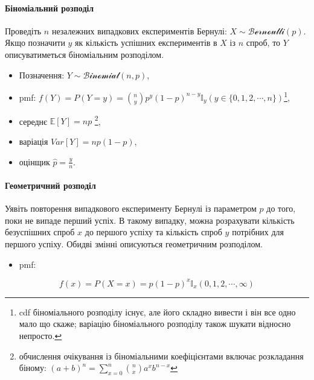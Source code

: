 \documentclass[
  11pt,
]{book}
\providecommand{\tightlist}{%
  \setlength{\itemsep}{0pt}\setlength{\parskip}{0pt}}
\begin{document}
\paragraph{Біноміальний
розподіл}\label{ux431ux456ux43dux43eux43cux456ux430ux43bux44cux43dux438ux439-ux440ux43eux437ux43fux43eux434ux456ux43b}

Проведіть \(n\) незалежних випадкових експериментів Бернулі:
\(X \sim \mathcal{Bernoulli}(p)\). Якщо позначити \(y\) як кількість
успішних експериментів в \(X\) із \(n\) спроб, то \(Y\) описуватиметься
біноміальним розподілом.

\begin{itemize}
\item
  Позначення: \(Y \sim \mathcal{Binomial}(n, p)\),
\item
  pmf:
  \(f(Y) = P(Y = y) = \binom{n}{y} p^y (1-p)^{n - y} \mathbb{I}_y (y \in \{0, 1, 2, \cdots, n\})\)\footnote{cdf
    біноміального розподілу існує, але його складно вивести і він все
    одно мало що скаже; варіацію біноміального розподілу також шукати
    відносно непросто.},
\item
  середнє \(\mathbb{E} [Y] = np\) \footnote{обчислення очікування із
    біноміальними коефіцієнтами включає розкладання біному:
    \((a + b)^n = \sum \limits_{x = 0}^n \binom{n}{x} a^x b^{n - x}\)},
\item
  варіація \(Var[Y] = np(1-p)\),
\item
  оцінщик \(\hat{p} = \frac{y}{n}\).
\end{itemize}

\paragraph{Геометричний
розподіл}\label{ux433ux435ux43eux43cux435ux442ux440ux438ux447ux43dux438ux439-ux440ux43eux437ux43fux43eux434ux456ux43b}

Уявіть повторення випадкового експерименту Бернулі із параметром \(p\)
до того, поки не випаде перший успіх. В такому випадку, можна
розрахувати кількість безуспішних спроб \(x\) до першого успіху та
кількість спроб \(y\) потрібних для першого успіху. Обидві змінні
описуються геометричним розподілом.

\begin{itemize}
\tightlist
\item
  pmf:
\end{itemize}

\[f(x) = P(X = x) = p(1 - p)^x \mathbb{I}_x (0, 1, 2, \cdots, \infty)\]
\end{document}
